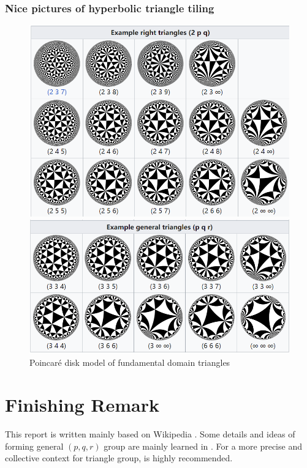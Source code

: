 \documentclass{article}
\begin{document}
\subsubsection{Nice pictures of hyperbolic triangle tiling}
\begin{figure}[ht]
    \centering
    \caption{Poincaré disk model of fundamental domain triangles}
    \label{Example}
    \begin{minipage}{0.49\linewidth}
        \centering
        \includegraphics[width={0.9\linewidth}]{Example01.png}
    \end{minipage}
    \begin{minipage}{0.49\linewidth}
        \centering
        \includegraphics[width={0.9\linewidth}]{Example02.png}
    \end{minipage}
\end{figure}

\section{Finishing Remark}
This report is written mainly based on Wikipedia \cite{google}. Some details and ideas of forming general $(p, q, r)$ group are mainly learned in \cite{Tgt}. For a more precise and collective context for triangle group, \cite{tesselations} is highly recommended.
\end{document}
